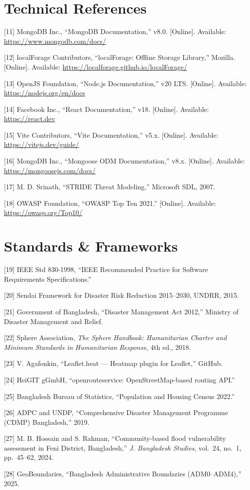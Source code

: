 \section{Technical References}

[11] MongoDB Inc., ``MongoDB Documentation,'' v8.0. [Online]. Available: \url{https://www.mongodb.com/docs/}

[12] localForage Contributors, ``localForage: Offline Storage Library,'' Mozilla. [Online]. Available: \url{https://localforage.github.io/localForage/}

[13] OpenJS Foundation, ``Node.js Documentation,'' v20 LTS. [Online]. Available: \url{https://nodejs.org/en/docs}

[14] Facebook Inc., ``React Documentation,'' v18. [Online]. Available: \url{https://react.dev}

[15] Vite Contributors, ``Vite Documentation,'' v5.x. [Online]. Available: \url{https://vitejs.dev/guide/}

[16] MongoDB Inc., ``Mongoose ODM Documentation,'' v8.x. [Online]. Available: \url{https://mongoosejs.com/docs/}

[17] M. D. Srinath, ``STRIDE Threat Modeling,'' Microsoft SDL, 2007.

[18] OWASP Foundation, ``OWASP Top Ten 2021.'' [Online]. Available: \url{https://owasp.org/Top10/}

\section{Standards \& Frameworks}

[19] IEEE Std 830-1998, ``IEEE Recommended Practice for Software Requirements Specifications.''

[20] Sendai Framework for Disaster Risk Reduction 2015--2030, UNDRR, 2015.

[21] Government of Bangladesh, ``Disaster Management Act 2012,'' Ministry of Disaster Management and Relief.

[22] Sphere Association, \textit{The Sphere Handbook: Humanitarian Charter and Minimum Standards in Humanitarian Response}, 4th ed., 2018.

[23] V. Agafonkin, ``Leaflet.heat --- Heatmap plugin for Leaflet,'' GitHub.

[24] HeiGIT gGmbH, ``openrouteservice: OpenStreetMap-based routing API.''

[25] Bangladesh Bureau of Statistics, ``Population and Housing Census 2022.''

[26] ADPC and UNDP, ``Comprehensive Disaster Management Programme (CDMP) Bangladesh,'' 2019.

[27] M. B. Hossain and S. Rahman, ``Community-based flood vulnerability assessment in Feni District, Bangladesh,'' \textit{J. Bangladesh Studies}, vol.~24, no.~1, pp.~45--62, 2024.

[28] GeoBoundaries, ``Bangladesh Administrative Boundaries (ADM0--ADM4),'' 2025.
